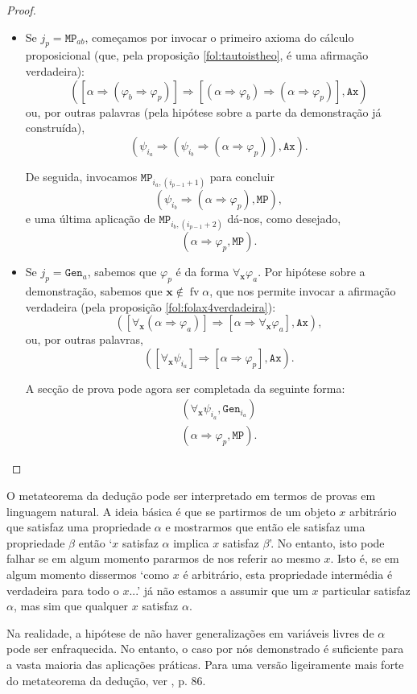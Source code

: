 \documentclass{report}
\theoremstyle{definition}
\theoremstyle{remark}
\renewcommand{\bf}[1]{\mathbf{#1}}
\DeclareMathOperator{\fv}{fv}
\newcommand{\imply}{\mathbin{\Rightarrow}}
\begin{document}
\begin{proof}
\begin{itemize}
	\item Se $j_p = \mathtt{MP}_{ab}$, começamos por invocar o primeiro axioma do cálculo proposicional (que, pela proposição \ref{fol:tautoistheo}, é uma afirmação verdadeira):
	\[([\alpha \imply (\varphi_b \imply \varphi_p)] \imply [(\alpha \imply \varphi_b) \imply (\alpha \imply \varphi_p)], \texttt{Ax})\]
	ou, por outras palavras (pela hipótese sobre a parte da demonstração já construída),
	\[(\psi_{i_a} \imply (\psi_{i_b} \imply (\alpha \imply \varphi_p)), \texttt{Ax}).\]
	
	De seguida, invocamos $\mathtt{MP}_{i_a, (i_{p-1}+1)}$ para concluir
	\[(\psi_{i_b} \imply (\alpha \imply \varphi_p), \texttt{MP}),\]
	e uma última aplicação de $\mathtt{MP}_{i_b, (i_{p-1}+2)}$ dá-nos, como desejado,
	\[(\alpha \imply \varphi_p, \texttt{MP}).\]
	
	\item Se $j_p = \mathtt{Gen}_a$, sabemos que $\varphi_p$ é da forma $\forall_{\bf x} \varphi_a$. Por hipótese sobre a demonstração, sabemos que $\bf x \not \in \fv \alpha$, que nos permite invocar a afirmação verdadeira (pela proposição \ref{fol:folax4verdadeira}):
	\[([\forall_{\bf x} (\alpha \imply \varphi_a)] \imply [\alpha \imply \forall_{\bf x} \varphi_a], \mathtt{Ax}),\]
	ou, por outras palavras,
	\[([\forall_{\bf x} \psi_{i_a}] \imply [\alpha \imply \varphi_p], \mathtt{Ax}).\]
	
	A secção de prova pode agora ser completada da seguinte forma:
	\begin{gather*}
	(\forall_{\bf x} \psi_{i_a}, \mathtt{Gen}_{i_a})\\
	(\alpha \imply \varphi_p, \mathtt{MP}).
	\end{gather*}
	\end{itemize}
	\end{proof}
	
	O metateorema da dedução pode ser interpretado em termos de provas em linguagem natural. A ideia básica é que se partirmos de um objeto $x$ arbitrário que satisfaz uma propriedade $\alpha$ e mostrarmos que então ele satisfaz uma propriedade $\beta$ então `$x$ satisfaz $\alpha$ implica $x$ satisfaz $\beta$'. No entanto, isto pode falhar se em algum momento pararmos de nos referir ao mesmo $x$. Isto é, se em algum momento dissermos `como $x$ é arbitrário, esta propriedade intermédia é verdadeira para todo o $x$...' já não estamos a assumir que um $x$ particular satisfaz $\alpha$, mas sim que qualquer $x$ satisfaz $\alpha$.
	
	Na realidade, a hipótese de não haver generalizações em variáveis livres de $\alpha$ pode ser enfraquecida. No entanto, o caso por nós demonstrado é suficiente para a vasta maioria das aplicações práticas. Para uma versão ligeiramente mais forte do metateorema da dedução, ver \cite{fltc}, p. 86.
	
\end{document}
